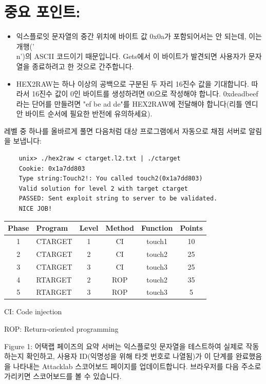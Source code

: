 \documentclass[10pt]{article}
\begin{document}
\section*{중요 포인트:}
\begin{itemize}
 \item 익스플로잇 문자열의 중간 위치에 바이트 값 0x0a가 포함되어서는 안 되는데, 이는 개행('\\n')의 ASCII 코드이기 때문입니다. Gets에서 이 바이트가 발견되면 사용자가 문자열을 종료하려고 한 것으로 간주합니다.
  \item HEX2RAW는 하나 이상의 공백으로 구분된 두 자리 16진수 값을 기대합니다. 따라서 16진수 값이 0인 바이트를 생성하려면 00으로 작성해야 합니다. 0xdeadbeef라는 단어를 만들려면 "ef be ad de"를 HEX2RAW에 전달해야 합니다(리틀 엔디안 바이트 순서에 필요한 반전에 유의하세요).
\end{itemize}
\noindent
레벨 중 하나를 올바르게 풀면 다음처럼 대상 프로그램에서 자동으로 채점 서버로 알림을 보냅니다:

\begin{verbatim}
    unix> ./hex2raw < ctarget.l2.txt | ./ctarget
    Cookie: 0x1a7dd803
    Type string:Touch2!: You called touch2(0x1a7dd803)
    Valid solution for level 2 with target ctarget
    PASSED: Sent exploit string to server to be validated.
    NICE JOB!
\end{verbatim}

\begin{center}
\begin{tabular}{|c|l|c|c|c|c|}
\hline
Phase & Program & Level & Method & Function & Points \\
\hline
1 & CTARGET & 1 & CI & touch1 & 10 \\
2 & CTARGET & 2 & CI & touch2 & 25 \\
3 & CTARGET & 3 & CI & touch3 & 25 \\
\hline
4 & RTARGET & 2 & ROP & touch2 & 35 \\
5 & RTARGET & 3 & ROP & touch3 & 5 \\
\hline
\end{tabular}

CI: Code injection

ROP: Return-oriented programming
\end{center}

Figure 1: 어택랩 페이즈의 요약
\noindent
서버는 익스플로잇 문자열을 테스트하여 실제로 작동하는지 확인하고, 사용자 ID(익명성을 위해 타겟 번호로 나열됨)가 이 단계를 완료했음을 나타내는 Attacklab 스코어보드 페이지를 업데이트합니다.
\noindent
브라우저를 다음 주소로 가리키면 스코어보드를 볼 수 있습니다.
\end{document}
